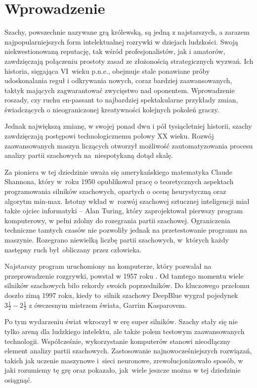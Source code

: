 \section{Wprowadzenie}
\label{sec:wprowadzenie}

Szachy, powszechnie nazywane grą królewską, są jedną z najstarszych, a zarazem najpopularniejszych form intelektualnej rozrywki w dziejach ludzkości.
Swoją niekwestionowaną reputację, tak wśród profesjonalistów, jak i amatorów, zawdzięczają połączeniu prostoty zasad ze złożonością strategicznych wyzwań.
Ich historia, sięgająca VI~wieku p.n.e., obejmuje stale ponawiane próby udoskonalania reguł i odkrywania nowych, coraz bardziej zaawansowanych, taktyk mających zagwarantować zwycięstwo nad oponentem.
Wprowadzenie roszady, czy ruchu en-passant to najbardziej spektakularne przykłady zmian, świadczących o nieograniczonej kreatywności kolejnych pokoleń graczy.


Jednak największą zmianę, w swojej ponad dwu i pół tysiącletniej historii, szachy zawdzięczają postępowi technologicznemu połowy XX wieku.
Rozwój zaawansowanych maszyn liczących otworzył możliwość zautomatyzowania procesu analizy partii szachowych na~niespotykaną dotąd skalę.


Za pioniera w tej dziedzinie uważa się amerykańskiego matematyka Claude Shannona, który w~roku 1950 opublikował pracę o teoretycznych aspektach programowania silników szachowych, opartych o ocenę heurystyczną oraz algorytm min-max.
Istotny wkład w~rozwój szachowej sztucznej inteligencji miał także ojciec informatyki – Alan Turing, który zaprojektował pierwszy program komputerowy, w pełni zdolny do rozegrania partii szachowej.
Ograniczenia techniczne tamtych czasów nie pozwoliły jednak na przetestowanie programu na maszynie.
Rozegrano niewielką liczbę partii szachowych, w~których każdy następny ruch był~obliczany przez człowieka.


Najstarszy program uruchomiony na komputerze, który pozwalał na przeprowadzenie rozgrywki, powstał w 1957 roku \cite{first-1957}.
Od tamtego momentu wiele silników szachowych biło rekordy swoich poprzedników.
Do kluczowego przełomu doszło zimą 1997 roku, kiedy to~silnik szachowy DeepBlue wygrał pojedynek $3\frac{1}{2} - 2\frac{1}{2}$ z ówczesnym mistrzem świata, Garrim Kasparovem.


Po tym wydarzeniu świat wkroczył w erę super silników.
Szachy stały się nie tylko areną dla ludzkiego intelektu, ale także polem testowym zaawansowanych technologii.
Współcześnie, wykorzystanie komputerów stanowi nieodłączny element analizy partii szachowych.
Zastosowanie najnowocześniejszych rozwiązań, takich jak uczenie maszynowe i~sieci neuronowe, zrewolucjonizowało sposób, w jaki rozumiemy tę grę oraz pokazało, jak~wiele jeszcze można w tej dziedzinie osiągnąć.

